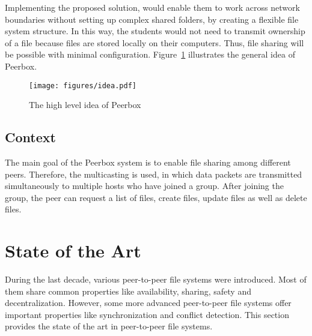 Implementing the proposed solution, would  enable them to work across network boundaries without setting up complex shared folders, by creating a flexible file system structure. In this way, the students would not need to transmit ownership of a file because  files are stored locally on their computers. Thus, file sharing will be possible with minimal configuration. Figure~\ref{fig:idea} illustrates the general idea of Peerbox.
 
\begin{figure}[H]
\begin{center}
\texttt{[image: figures/idea.pdf]}
\caption{The high level idea of Peerbox}
\label{fig:idea}
\end{center}
\end{figure}



\subsection{Context}
The main goal of the Peerbox system is to enable file sharing among different peers. Therefore, the multicasting is used, in which data packets are transmitted simultaneously to multiple hosts who have joined a group. 
After joining the group, the peer can request a list of files, create files, update  files as well as delete files.

\clearpage
\section{State of the Art}

During the last decade, various peer-to-peer file systems were introduced. Most of them share common properties like availability, sharing, safety and decentralization. However, some more advanced peer-to-peer file systems offer important properties like synchronization and conflict detection. This section provides the state of the art in peer-to-peer file systems.

